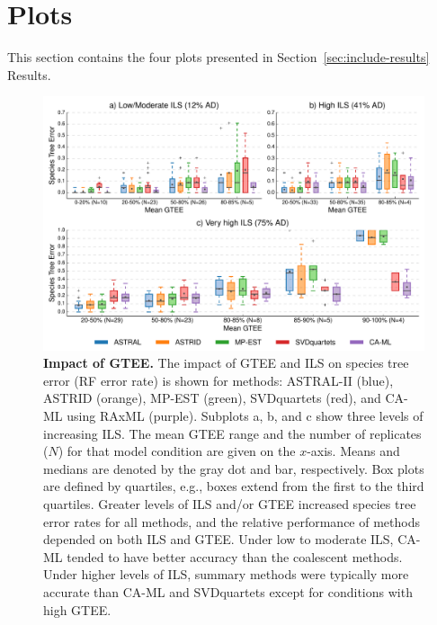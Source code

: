 \clearpage

\section{Plots}
\label{sec:include-plots}
This section contains the four plots presented in Section~\ref{sec:include-results} Results.

\vspace{12pt}

\begin{figure}[!h]
\centering
\includegraphics[width=1.0\textwidth]{figures/gene-filtering-fig1.pdf}
\caption{{\bf Impact of GTEE.} The impact of GTEE and ILS on species tree error (RF error rate) is shown for methods: ASTRAL-II (blue), ASTRID (orange), MP-EST (green), SVDquartets (red), and CA-ML using RAxML (purple). 
Subplots a, b, and c show three levels of increasing ILS. 
The mean GTEE range and the number of replicates ($N$) for that model condition are given on the $x$-axis. 
Means and medians are denoted by the gray dot and bar, respectively. Box plots are defined by quartiles, e.g., boxes extend from the first to the third quartiles. 
Greater levels of ILS and/or GTEE increased species tree error rates for all methods, and the relative performance of methods depended on both ILS and GTEE. 
Under low to moderate ILS, CA-ML tended to have better accuracy than the coalescent methods. 
Under higher levels of ILS, summary methods were typically more accurate than CA-ML and SVDquartets except for conditions with high GTEE.}
\label{fig:include-1}
\end{figure}


